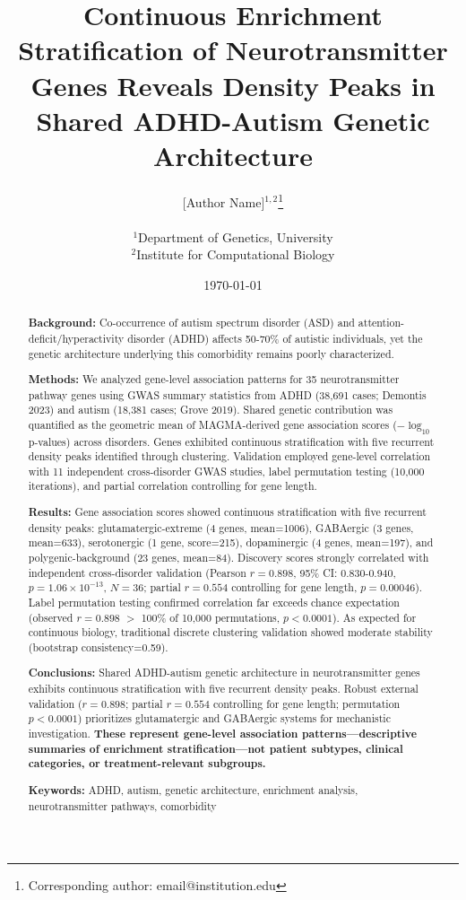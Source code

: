\documentclass[12pt,letterpaper]{article}
\title{\textbf{Continuous Enrichment Stratification of Neurotransmitter Genes Reveals Density Peaks in Shared ADHD-Autism Genetic Architecture}}
\author{
    [Author Name]$^{1,2}$\thanks{Corresponding author: email@institution.edu}\\
    \\
    \small $^1$Department of Genetics, University\\
    \small $^2$Institute for Computational Biology
}
\date{\today}
\theoremstyle{definition}
\theoremstyle{remark}
\begin{document}
\maketitle

\begin{abstract}
\noindent
\textbf{Background:} Co-occurrence of autism spectrum disorder (ASD) and attention-deficit/hyperactivity disorder (ADHD) affects 50-70\% of autistic individuals, yet the genetic architecture underlying this comorbidity remains poorly characterized.

\noindent
\textbf{Methods:} We analyzed gene-level association patterns for 35 neurotransmitter pathway genes using GWAS summary statistics from ADHD (38,691 cases; Demontis 2023) and autism (18,381 cases; Grove 2019). Shared genetic contribution was quantified as the geometric mean of MAGMA-derived gene association scores ($-\log_{10}$ p-values) across disorders. Genes exhibited continuous stratification with five recurrent density peaks identified through clustering. Validation employed gene-level correlation with 11 independent cross-disorder GWAS studies, label permutation testing (10,000 iterations), and partial correlation controlling for gene length.

\noindent
\textbf{Results:} Gene association scores showed continuous stratification with five recurrent density peaks: glutamatergic-extreme (4 genes, mean=1006), GABAergic (3 genes, mean=633), serotonergic (1 gene, score=215), dopaminergic (4 genes, mean=197), and polygenic-background (23 genes, mean=84). Discovery scores strongly correlated with independent cross-disorder validation (Pearson $r=0.898$, 95\% CI: 0.830-0.940, $p=1.06 \times 10^{-13}$, $N=36$; partial $r=0.554$ controlling for gene length, $p=0.00046$). Label permutation testing confirmed correlation far exceeds chance expectation (observed $r=0.898$ $>$ 100\% of 10,000 permutations, $p<0.0001$). As expected for continuous biology, traditional discrete clustering validation showed moderate stability (bootstrap consistency=0.59).

\noindent
\textbf{Conclusions:} Shared ADHD-autism genetic architecture in neurotransmitter genes exhibits continuous stratification with five recurrent density peaks. Robust external validation ($r=0.898$; partial $r=0.554$ controlling for gene length; permutation $p<0.0001$) prioritizes glutamatergic and GABAergic systems for mechanistic investigation. \textbf{These represent gene-level association patterns---descriptive summaries of enrichment stratification---not patient subtypes, clinical categories, or treatment-relevant subgroups.}

\noindent
\textbf{Keywords:} ADHD, autism, genetic architecture, enrichment analysis, neurotransmitter pathways, comorbidity
\end{abstract}
\end{document}
